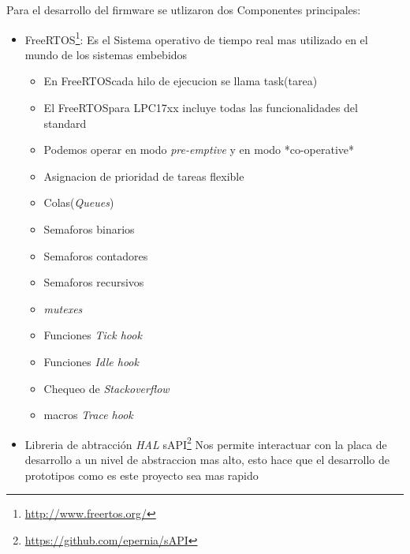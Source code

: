 \documentclass[10pt]{article}
\begin{document}
Para el desarrollo del firmware se utlizaron dos Componentes principales:
\begin{itemize}
   \item FreeRTOS\texttrademark\footnote{\url{http://www.freertos.org/}}: Es el Sistema operativo de tiempo real mas utilizado en el mundo de los sistemas embebidos 
      \begin{itemize}
         \item En FreeRTOS\texttrademark cada hilo de ejecucion se llama task(tarea)
         \item El FreeRTOS\texttrademark para LPC17xx incluye todas las funcionalidades del standard
         \item Podemos operar en modo \textit{pre-emptive} y en modo *co-operative*
         \item Asignacion de prioridad de tareas flexible
         \item Colas(\textit{Queues})
         \item Semaforos binarios
         \item Semaforos contadores
         \item Semaforos recursivos
         \item \textit{mutexes}
         \item Funciones \textit{Tick hook}
         \item Funciones \textit{Idle hook}
         \item Chequeo de \textit{Stackoverflow}
         \item macros \textit{Trace hook}
      \end{itemize}
   \item Libreria de abtracción \textit{HAL} sAPI\footnote{\url{https://github.com/epernia/sAPI}} Nos permite interactuar con la placa de desarrollo a un nivel de abstraccion mas alto, esto hace que el desarrollo de prototipos como es este proyecto sea mas rapido
\end{itemize}
\end{document}
